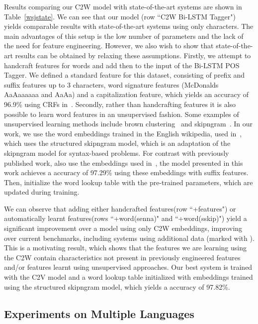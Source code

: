 \documentclass[11pt]{article}
\begin{document}
\begin{CJK*}{UTF8}{gbsn}
{Results comparing our C2W model with state-of-the-art systems are shown in Table~\ref{wsjstate}. We can see that our model (row ``C2W Bi-LSTM Tagger") yields comparable results with state-of-the-art systems using only characters. The main advantages of this setup is the low number of parameters and the lack of the need for feature engineering. However, we also wish to show that state-of-the-art results can be obtained by relaxing these assumptions. Firstly, we attempt to handcraft features for words and add then to the input of the Bi-LSTM POS Tagger. We defined a standard feature for this dataset, consisting of prefix and suffix features up to 3 characters, word signature features (McDonalds  AaAaaaaaa and AaAa) and a capitalization feature, which yields an accuracy of 96.9\% using CRFs in~\cite{Liang08structurecompilation}. Secondly, rather than handcrafting features it is also possible to learn word features in an unsupervised fashion. Some examples of unsupervised learning methods include brown clustering~\cite{Brown:1992:CNG:176313.176316} and skipngram~\cite{mikolov2013distributed}. In our work, we use the word embeddings trained in the English wikipedia, used in~\cite{Ling:2015:naacl}, which uses the structured skipngram model, which is an adaptation of the skipngram model for syntax-based problems. For contrast with previously published work, also use the embeddings used in~\cite{collobert2011natural}, the model presented in this work achieves a accuracy of 97.29\% using these embeddings with suffix features. Then, initialize the word lookup table with the pre-trained parameters, which are updated during training.  

We can observe that adding either handcrafted features(row ``+features") or automatically learnt features(rows ``+word(senna)" and ``+word(sskip)") yield a significant improvement over a model using only C2W embeddings, improving over current benchmarks, including systems using additional data (marked with ). This is a motivating result, which shows that the features we are learning using the C2W contain characteristics not present in previously engineered features and/or features learnt using unsupervised approaches. Our best system is trained with the C2V model and a word lookup table initialized with embeddings trained using the structured skipngram model, which yields a accuracy of 97.82\%.

\subsection{Experiments on Multiple Languages}

}
\end{CJK*}
\end{document}
